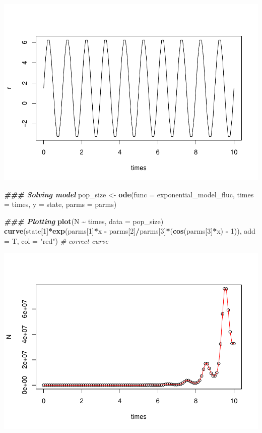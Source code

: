 \documentclass[
]{book}
\newenvironment{Shaded}{\begin{snugshade}}{\end{snugshade}}
\newcommand{\AttributeTok}[1]{\textcolor[rgb]{0.13,0.29,0.53}{#1}}
\newcommand{\CommentTok}[1]{\textcolor[rgb]{0.56,0.35,0.01}{\textit{#1}}}
\newcommand{\DecValTok}[1]{\textcolor[rgb]{0.00,0.00,0.81}{#1}}
\newcommand{\DocumentationTok}[1]{\textcolor[rgb]{0.56,0.35,0.01}{\textbf{\textit{#1}}}}
\newcommand{\FunctionTok}[1]{\textcolor[rgb]{0.13,0.29,0.53}{\textbf{#1}}}
\newcommand{\NormalTok}[1]{#1}
\newcommand{\OtherTok}[1]{\textcolor[rgb]{0.56,0.35,0.01}{#1}}
\newcommand{\SpecialCharTok}[1]{\textcolor[rgb]{0.81,0.36,0.00}{\textbf{#1}}}
\newcommand{\StringTok}[1]{\textcolor[rgb]{0.31,0.60,0.02}{#1}}
\begin{document}
\includegraphics{bookdown-demo_files/figure-latex/unnamed-chunk-10-1.pdf}

\begin{Shaded}
\begin{Highlighting}[]
\DocumentationTok{\#\#\# Solving model}
\NormalTok{pop\_size }\OtherTok{\textless{}{-}} \FunctionTok{ode}\NormalTok{(}\AttributeTok{func =}\NormalTok{ exponential\_model\_fluc, }\AttributeTok{times =}\NormalTok{ times, }\AttributeTok{y =}\NormalTok{ state, }\AttributeTok{parms =}\NormalTok{ parms)}

\DocumentationTok{\#\#\# Plotting}
\FunctionTok{plot}\NormalTok{(N }\SpecialCharTok{\textasciitilde{}}\NormalTok{ times, }\AttributeTok{data =}\NormalTok{ pop\_size)}
\FunctionTok{curve}\NormalTok{(state[}\DecValTok{1}\NormalTok{]}\SpecialCharTok{*}\FunctionTok{exp}\NormalTok{(parms[}\DecValTok{1}\NormalTok{]}\SpecialCharTok{*}\NormalTok{x }\SpecialCharTok{{-}}\NormalTok{ parms[}\DecValTok{2}\NormalTok{]}\SpecialCharTok{/}\NormalTok{parms[}\DecValTok{3}\NormalTok{]}\SpecialCharTok{*}\NormalTok{(}\FunctionTok{cos}\NormalTok{(parms[}\DecValTok{3}\NormalTok{]}\SpecialCharTok{*}\NormalTok{x) }\SpecialCharTok{{-}} \DecValTok{1}\NormalTok{)), }\AttributeTok{add =}\NormalTok{ T, }\AttributeTok{col =} \StringTok{"red"}\NormalTok{) }\CommentTok{\# correct curve}
\end{Highlighting}
\end{Shaded}

\includegraphics{bookdown-demo_files/figure-latex/unnamed-chunk-11-1.pdf}
\end{document}
